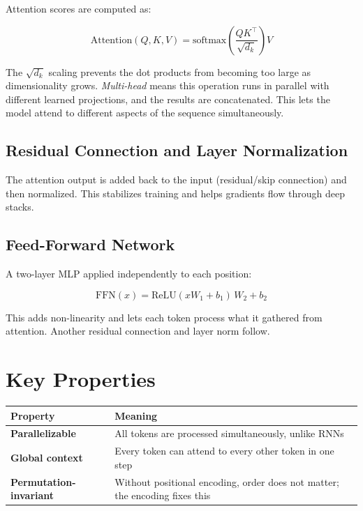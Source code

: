 \documentclass[12pt]{article}
\begin{document}
Attention scores are computed as:

\begin{equation}
    \text{Attention}(Q, K, V) = \text{softmax}\!\left(\frac{QK^\top}{\sqrt{d_k}}\right) V
\end{equation}

The $\sqrt{d_k}$ scaling prevents the dot products from becoming too large as dimensionality grows. \textit{Multi-head} means this operation runs in parallel with different learned projections, and the results are concatenated. This lets the model attend to different aspects of the sequence simultaneously.

\subsection{Residual Connection and Layer Normalization}

The attention output is added back to the input (residual/skip connection) and then normalized. This stabilizes training and helps gradients flow through deep stacks.

\subsection{Feed-Forward Network}

A two-layer MLP applied independently to each position:

\begin{equation}
    \text{FFN}(x) = \text{ReLU}(xW_1 + b_1)\,W_2 + b_2
\end{equation}

This adds non-linearity and lets each token process what it gathered from attention. Another residual connection and layer norm follow.

\section{Key Properties}

\begin{center}
\begin{tabular}{>{\bfseries}l p{9cm}}
\toprule
Property & Meaning \\
\midrule
Parallelizable & All tokens are processed simultaneously, unlike RNNs \\
Global context & Every token can attend to every other token in one step \\
Permutation-invariant & Without positional encoding, order does not matter; the encoding fixes this \\
\bottomrule
\end{tabular}
\end{center}
\end{document}
